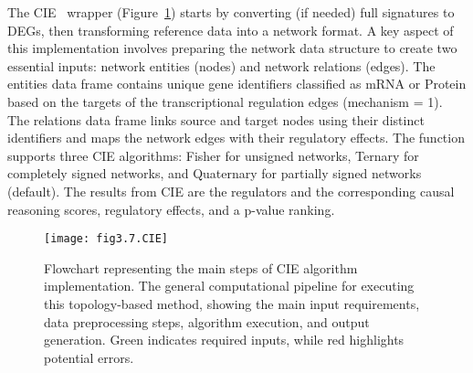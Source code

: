 The \gls{CIE}~\cite{RN81} wrapper (Figure~\ref{fig:fig3.7.CIE}) starts by converting (if needed) full signatures to \gls{DEGs}, then transforming reference data into a network format. A key aspect of this implementation involves preparing the network data structure to create two essential inputs: network entities (nodes) and network relations (edges). The entities data frame contains unique gene identifiers classified as \gls{mRNA} or Protein based on the targets of the transcriptional regulation edges (mechanism = 1). The relations data frame links source and target nodes using their distinct identifiers and maps the network edges with their regulatory effects. The function supports three \gls{CIE} algorithms: Fisher for unsigned networks, Ternary for completely signed networks, and Quaternary for partially signed networks (default). The results from \gls{CIE} are the regulators and the corresponding causal reasoning scores, regulatory effects, and a p-value ranking.

\begin{figure}[htbp]
    \centering
    \texttt{[image: fig3.7.CIE]}
    \caption[Flowchart representing the main steps of CIE algorithm implementation.]{Flowchart representing the main steps of \gls{CIE} algorithm implementation. The general computational pipeline for executing this topology-based method, showing the main input requirements, data preprocessing steps, algorithm execution, and output generation. Green indicates required inputs, while red highlights potential errors.}
    \label{fig:fig3.7.CIE}
\end{figure}

